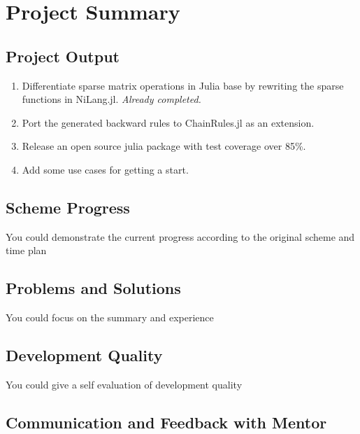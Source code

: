 
\vspace{0.5cm}  

\section{Project Summary}
\subsection{Project Output}
\begin{enumerate}[(1)]
    \item Differentiate sparse matrix operations in Julia base by rewriting the sparse functions in NiLang.jl.  
    \textit{Already completed.}
    \item Port the generated backward rules to ChainRules.jl as an extension.
    \item Release an open source julia package with test coverage over 85\%.
    \item Add some use cases for getting a start.
\end{enumerate}
\subsection{Scheme Progress}
You could demonstrate the current progress according to the original scheme and time plan
\subsection{Problems and Solutions}  
You could focus on the summary and experience
\subsection{Development Quality}
You could give a self evaluation of development quality
\subsection{Communication and Feedback with Mentor}

